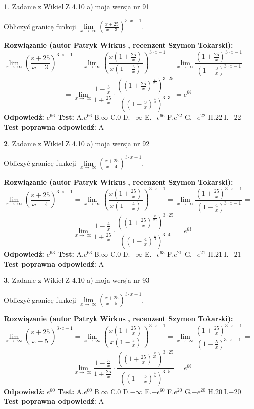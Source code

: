 \documentclass[12pt, a4paper]{article}
\theoremstyle{definition} %
\newtheorem{zad}{}
\newcommand{\zadStart}[1]{\begin{zad}#1\newline}
\newcommand{\zadStop}{\end{zad}}
\newcommand{\rozwStart}[2]{\noindent \textbf{Rozwiązanie (autor #1 , recenzent #2): }\newline}
\newcommand{\rozwStop}{\newline}
\newcommand{\odpStart}{\noindent \textbf{Odpowiedź:}\newline}
\newcommand{\odpStop}{\newline}
\newcommand{\testStart}{\noindent \textbf{Test:}\newline}
\newcommand{\testStop}{\newline}
\newcommand{\kluczStart}{\noindent \textbf{Test poprawna odpowiedź:}\newline}
\newcommand{\kluczStop}{\newline}
\begin{document}
\zadStart{Zadanie z Wikieł Z 4.10 a) moja wersja nr 91}

Obliczyć granicę funkcji  $\lim\limits_{x\to\ \infty}(\frac{x+25}{x-3})^{3\cdot x-1}$.
\zadStop
\rozwStart{Patryk Wirkus}{Szymon Tokarski}
$$\lim\limits_{x\to\ \infty}(\frac{x+25}{x-3})^{3\cdot x-1} = \lim\limits_{x\to\ \infty}(\frac{x(1+\frac{25}{x})}{x(1-\frac{3}{x})})^{3\cdot x-1}=\lim\limits_{x\to\ \infty}\frac{(1+\frac{25}{x})^{3\cdot x-1}}{(1-\frac{3}{x})^{3\cdot x-1}}=$$
$$=\lim\limits_{x\to\ \infty}\frac{1-\frac{3}{x}}{1+\frac{25}{x}}\cdot\frac{((1+\frac{25}{x})^{\frac{x}{25}})^{3\cdot25}}{((1-\frac{3}{x})^{\frac{x}{3}})^{3\cdot3}}=e^{66}$$
\rozwStop
\odpStart
$e^{66}$
\odpStop
\testStart
A.$e^{66}$ B.$\infty$ C.$0$ D.$-\infty$ E.$-e^{66}$
F.$e^{22}$ G.$-e^{22}$
H.$22$
I.$-22$
\testStop
\kluczStart
A
\kluczStop



\zadStart{Zadanie z Wikieł Z 4.10 a) moja wersja nr 92}

Obliczyć granicę funkcji  $\lim\limits_{x\to\ \infty}(\frac{x+25}{x-4})^{3\cdot x-1}$.
\zadStop
\rozwStart{Patryk Wirkus}{Szymon Tokarski}
$$\lim\limits_{x\to\ \infty}(\frac{x+25}{x-4})^{3\cdot x-1} = \lim\limits_{x\to\ \infty}(\frac{x(1+\frac{25}{x})}{x(1-\frac{4}{x})})^{3\cdot x-1}=\lim\limits_{x\to\ \infty}\frac{(1+\frac{25}{x})^{3\cdot x-1}}{(1-\frac{4}{x})^{3\cdot x-1}}=$$
$$=\lim\limits_{x\to\ \infty}\frac{1-\frac{4}{x}}{1+\frac{25}{x}}\cdot\frac{((1+\frac{25}{x})^{\frac{x}{25}})^{3\cdot25}}{((1-\frac{4}{x})^{\frac{x}{4}})^{3\cdot4}}=e^{63}$$
\rozwStop
\odpStart
$e^{63}$
\odpStop
\testStart
A.$e^{63}$ B.$\infty$ C.$0$ D.$-\infty$ E.$-e^{63}$
F.$e^{21}$ G.$-e^{21}$
H.$21$
I.$-21$
\testStop
\kluczStart
A
\kluczStop



\zadStart{Zadanie z Wikieł Z 4.10 a) moja wersja nr 93}

Obliczyć granicę funkcji  $\lim\limits_{x\to\ \infty}(\frac{x+25}{x-5})^{3\cdot x-1}$.
\zadStop
\rozwStart{Patryk Wirkus}{Szymon Tokarski}
$$\lim\limits_{x\to\ \infty}(\frac{x+25}{x-5})^{3\cdot x-1} = \lim\limits_{x\to\ \infty}(\frac{x(1+\frac{25}{x})}{x(1-\frac{5}{x})})^{3\cdot x-1}=\lim\limits_{x\to\ \infty}\frac{(1+\frac{25}{x})^{3\cdot x-1}}{(1-\frac{5}{x})^{3\cdot x-1}}=$$
$$=\lim\limits_{x\to\ \infty}\frac{1-\frac{5}{x}}{1+\frac{25}{x}}\cdot\frac{((1+\frac{25}{x})^{\frac{x}{25}})^{3\cdot25}}{((1-\frac{5}{x})^{\frac{x}{5}})^{3\cdot5}}=e^{60}$$
\rozwStop
\odpStart
$e^{60}$
\odpStop
\testStart
A.$e^{60}$ B.$\infty$ C.$0$ D.$-\infty$ E.$-e^{60}$
F.$e^{20}$ G.$-e^{20}$
H.$20$
I.$-20$
\testStop
\kluczStart
A
\kluczStop
\end{document}
